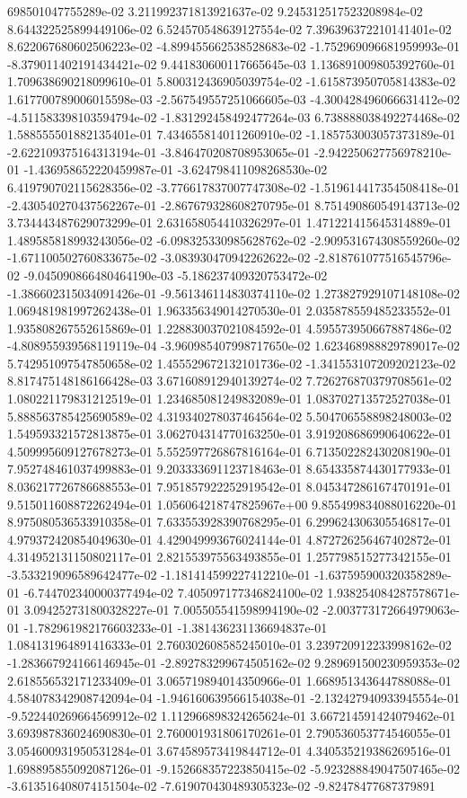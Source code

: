698501047755289e-02	3.211992371813921637e-02	9.245312517523208984e-02	8.644322525899449106e-02	6.524570548639127554e-02	7.396396372210141401e-02	8.622067680602506223e-02	-4.899455662538528683e-02	-1.752969096681959993e-01	-8.379011402191434421e-02	9.441830600117665645e-03	1.136891009805392760e-01	1.709638690218099610e-01	5.800312436905039754e-02	-1.615873950705814383e-02	1.617700789006015598e-03	-2.567549557251066605e-03	-4.300428496066631412e-02	-4.511583398103594794e-02	-1.831292458492477264e-03	6.738888038492274468e-02	1.588555501882135401e-01	7.434655814011260910e-02	-1.185753003057373189e-01	-2.622109375164313194e-01	-3.846470208708953065e-01	-2.942250627756978210e-01	-1.436958652220459987e-01	-3.624798411098268530e-02	6.419790702115628356e-02	-3.776617837007747308e-02	-1.519614417354508418e-01	-2.430540270437562267e-01	-2.867679328608270795e-01	8.751490860549143713e-02	3.734443487629073299e-01	2.631658054410326297e-01	1.471221415645314889e-01	1.489585818993243056e-02	-6.098325330985628762e-02	-2.909531674308559260e-02	-1.671100502760833675e-02	-3.083930470942262622e-02	-2.818761077516545796e-02	-9.045090866480464190e-03	-5.186237409320753472e-02	-1.386602315034091426e-01	-9.561346114830374110e-02	1.273827929107148108e-02	1.069481981997262438e-01	1.963356349014270530e-01	2.035878559485233552e-01	1.935808267552615869e-01	1.228830037021084592e-01	4.595573950667887486e-02	-4.808955939568119119e-04	-3.960985407998717650e-02	1.623468988829789017e-02	5.742951097547850658e-02	1.455529672132101736e-02	-1.341553107209202123e-02	8.817475148186166428e-03	3.671608912940139274e-02	7.726276870379708561e-02	1.080221179831212519e-01	1.234685081249832089e-01	1.083702713572527038e-01	5.888563785425690589e-02	4.319340278037464564e-02	5.504706558898248003e-02	1.549593321572813875e-01	3.062704314770163250e-01	3.919208686990640622e-01	4.509995609127678273e-01	5.552597726867816164e-01	6.713502282430208190e-01	7.952748461037499883e-01	9.203333691123718463e-01	8.654335874430177933e-01	8.036217726786688553e-01	7.951857922252919542e-01	8.045347286167470191e-01	9.515011608872262494e-01	1.056064218747825967e+00	9.855499834088016220e-01	8.975080536533910358e-01	7.633553928390768295e-01	6.299624306305546817e-01	4.979372420854049630e-01	4.429049993676024144e-01	4.872726256467402872e-01	4.314952131150802117e-01	2.821553975563493855e-01	1.257798515277342155e-01	-3.533219096589642477e-02	-1.181414599227412210e-01	-1.637595900320358289e-01	-6.744702340000377494e-02	7.405097177346824100e-02	1.938254084287578671e-01	3.094252731800328227e-01	7.005505541598994190e-02	-2.003773172664979063e-01	-1.782961982176603233e-01	-1.381436231136694837e-01	1.084131964891416333e-01	2.760302608585245010e-01	3.239720912233998162e-02	-1.283667924166146945e-01	-2.892783299674505162e-02	9.289691500230959353e-02	2.618556532171233409e-01	3.065719894014350966e-01	1.668951343644788088e-01	4.584078342908742094e-04	-1.946160639566154038e-01	-2.132427940933945554e-01	-9.522440269664569912e-02	1.112966898324265624e-01	3.667214591424079462e-01	3.693987836024690830e-01	2.760001931806170261e-01	2.790536053774546055e-01	3.054600931950531284e-01	3.674589573419844712e-01	4.340535219386269516e-01	1.698895855092087126e-01	-9.152668357223850415e-02	-5.923288849047507465e-02	-3.613516408074151504e-02	-7.619070430489305323e-02	-9.82478477687379891